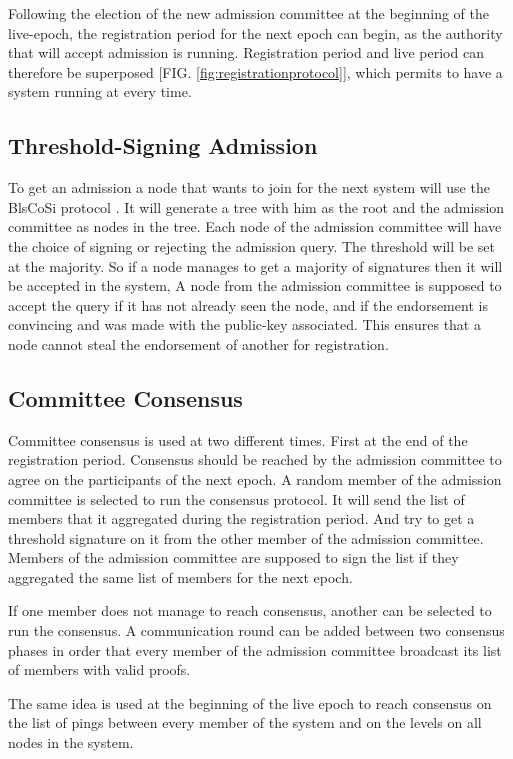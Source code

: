 \documentclass[a4paper,11pt,oneside]{report}
\begin{document}
Following the election of the new admission committee at the beginning of the
live-epoch, the registration period for the next epoch can begin, as the
authority that will accept admission is running. Registration period and live
period can therefore be superposed [FIG. \autoref{fig:registrationprotocol}], which
permits to have a system running at every time. 

\subsection{Threshold-Signing Admission}
To get an admission a node that wants to join for the next system will use the
BlsCoSi protocol \cite{Boneh2018}. It will generate a tree with him as
the root and the admission committee as nodes in the tree. Each node of the
admission committee will have the choice of signing or rejecting the admission
query. The threshold will be set at the majority. So if a node manages to get a
majority of signatures then it will be accepted in the system, A node from the
admission committee is supposed to accept the query if it has not already seen
the node, and if the endorsement is convincing and was made with the public-key
associated. This ensures that a node cannot steal the endorsement of another
for registration.  

\subsection{Committee Consensus}
Committee consensus is used at two different times. First at the end of the
registration period. Consensus should be reached by the admission committee to agree on
the participants of the next epoch. A random member of the admission committee
is selected to run the consensus protocol. It will send the list of members
that it aggregated during the registration period. And try to get a threshold
signature on it from the other member of the admission committee. Members of
the admission committee are supposed to sign the list if they aggregated the
same list of members for the next epoch.

If one member does not manage to reach consensus, another can be selected to
run the consensus. A communication round can be added between two consensus
phases in order that every member of the admission committee broadcast its list
of members with valid proofs.

The same idea is used at the beginning of the live epoch to reach consensus on
the list of pings between every member of the system and on the levels on all
nodes in the system.
\end{document}
